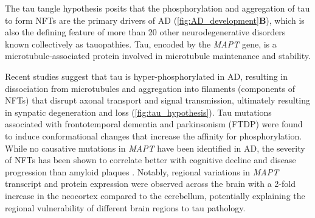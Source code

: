 \newpage
{} 
The tau tangle hypothesis posits that the phosphorylation and aggregation of tau to form NFTs are the primary drivers of AD\cite{KS1986} (\cref{fig:AD_development}\textbf{B}), which is also the defining feature of more than 20 other neurodegenerative disorders known collectively as tauopathies\cite{Orr2017}. Tau, encoded by the \textit{MAPT} gene, is a microtubule-associated protein involved in microtubule maintenance and stability. 

Recent studies suggest that tau is hyper-phosphorylated in AD, resulting in dissociation from microtubules and aggregation into filaments\cite{Grundke-Iqbal1986,Grundke-Iqbal1986a} (components of NFTs) that disrupt axonal transport and signal transmission, ultimately resulting in synpatic degeneration and loss\cite{Coomans2021} (\cref{fig:tau_hypothesis}). Tau mutations associated with frontotemporal dementia and parkinsonism (FTDP)  were found to induce conformational changes that increase the affinity for phosphorylation\cite{Alonso2004}. While no causative mutations in \textit{MAPT} have been identified in AD, the severity of NFTs has been shown to correlate better with cognitive decline and disease progression than amyloid plaques \cite{Serrano-Pozo2016,Giannakopoulos2003,PV1992}. Notably, regional variations in \textit{MAPT} transcript and protein expression were observed across the brain with a 2-fold increase in the neocortex compared to the cerebellum, potentially explaining the regional vulnerability of different brain regions to tau pathology\cite{Trabzuni2012}. 

